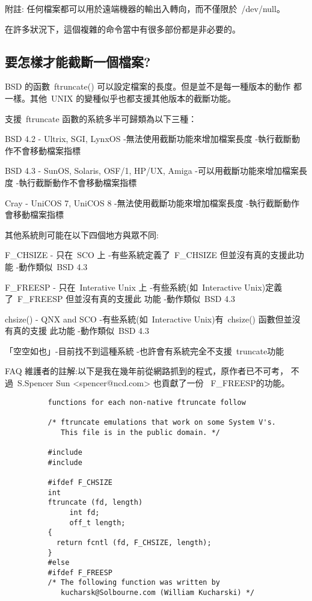 \documentclass{article}
\begin{document}
\begin{CJK*}{Bg5}{ming}
	附註: 任何檔案都可以用於遠端機器的輸出入轉向，而不僅限於~/dev/null。

	在許多狀況下，這個複雜的命令當中有很多部份都是非必要的。

\subsection{要怎樣才能截斷一個檔案?}

	BSD 的函數~ftruncate() 可以設定檔案的長度。但是並不是每一種版本的動作
        都一樣。其他~UNIX 的變種似乎也都支援其他版本的截斷功能。

	支援~ftruncate 函數的系統多半可歸類為以下三種：

	BSD 4.2 - Ultrix, SGI, LynxOS
		-無法使用截斷功能來增加檔案長度
		-執行截斷動作不會移動檔案指標

	BSD 4.3 - SunOS, Solaris, OSF/1, HP/UX, Amiga
		-可以用截斷功能來增加檔案長度
		-執行截斷動作不會移動檔案指標

	Cray - UniCOS 7, UniCOS 8
		-無法使用截斷功能來增加檔案長度
		-執行截斷動作會移動檔案指標

	其他系統則可能在以下四個地方與眾不同:

	F\_CHSIZE - 只在~SCO 上
		-有些系統定義了~F\_CHSIZE 但並沒有真的支援此功能
		-動作類似~BSD 4.3

	F\_FREESP - 只在~Interative Unix 上
		-有些系統(如~Interactive Unix)定義了~F\_FREESP 但並沒有真的支援此
		 功能
		-動作類似~BSD 4.3

	chsize() - QNX and SCO
		-有些系統(如~Interactive Unix)有~chsize() 函數但並沒有真的支援
                 此功能
		-動作類似~BSD 4.3

	「空空如也」-目前找不到這種系統
		-也許會有系統完全不支援~truncate功能

	FAQ 維護者的註解:以下是我在幾年前從網路抓到的程式，原作者已不可考，
                         不過~S.Spencer Sun <spencer@ncd.com> 也貢獻了一份
                         ~F\_FREESP的功能。
\small
\begin{verbatim}
	      functions for each non-native ftruncate follow

	      /* ftruncate emulations that work on some System V's.
	         This file is in the public domain. */

	      #include 
	      #include 

	      #ifdef F_CHSIZE
	      int
	      ftruncate (fd, length)
	           int fd;
	           off_t length;
	      {
	        return fcntl (fd, F_CHSIZE, length);
	      }
	      #else
	      #ifdef F_FREESP
	      /* The following function was written by
	         kucharsk@Solbourne.com (William Kucharski) */


\end{verbatim}
\end{CJK*}
\end{document}
